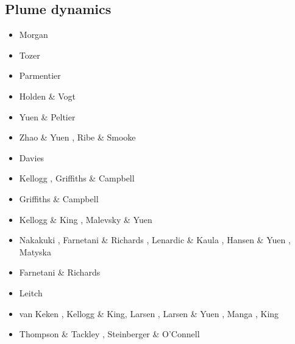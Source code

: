 \subsection{Plume dynamics}

\begin{scriptsize}
\begin{itemize}
\item[\nineteenseventyone] Morgan \cite{morg71}
\item[\nineteenseventythree] Tozer \cite{toze73}
\item[\nineteenseventyfive] Parmentier \etal \cite{patt75}
\item[\nineteenseventyseven] Holden \& Vogt \cite{hovo77}
\item[\nineteeneighty] Yuen \& Peltier \cite{yupe80}
\item[\nineteeneightyseven] Zhao \& Yuen \cite{zhyu87}, Ribe \& Smooke \cite{rism87}
\item[\nineteenninety] Davies \cite{davi90}
\item[\nineteenninetyone] Kellogg \cite{kell91}, Griffiths \& Campbell \cite{grca91b}
\item[\nineteenninety] Griffiths \& Campbell \cite{grca90}
\item[\nineteenninetythree] Kellogg \& King \cite{keki93}, Malevsky \& Yuen \cite{mayu93}
\item[\nineteenninetyfour] Nakakuki \etal \cite{nasf94}, Farnetani \& Richards \cite{fari94},
                           Lenardic \& Kaula \cite{leka94b}, Hansen \& Yuen \cite{hayu94},
                           Matyska \etal \cite{mamy94}
\item[\nineteenninetyfive] Farnetani \& Richards \cite{fari95}
\item[\nineteenninetysix] Leitch \etal \cite{lesy96} 
\item[\nineteenninetyseven] van Keken \cite{vank97}, Kellogg \& King\cite{keki97},
                            Larsen \etal \cite{laym97}, Larsen \& Yuen \cite{layu97,layu97b},
                            Manga \cite{mang97}, King \cite{king97} 
\item[\nineteenninetyeight] Thompson \& Tackley \cite{thta98}, Steinberger \& O'Connell \cite{stoc98}

\end{itemize}
\end{scriptsize}
